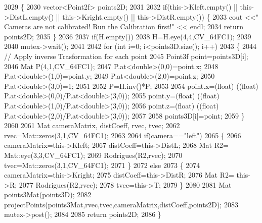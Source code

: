 \begin{DoxyCode}
2029 \{
2030     vector<Point2f> points2D;
2031 
2032     \textcolor{keywordflow}{if}(this->Kleft.empty() || this->DistL.empty() || this->Kright.empty() || this->DistR.empty()) \{
2033         cout <<\textcolor{stringliteral}{" Cameras are not calibrated! Run the Calibration first!"} << endl;
2034         \textcolor{keywordflow}{return} points2D;
2035     \}
2036 
2037     \textcolor{keywordflow}{if}(H.empty())
2038         H=H.eye(4,4,CV\_64FC1);
2039 
2040     mutex->wait();
2041 
2042     \textcolor{keywordflow}{for} (\textcolor{keywordtype}{int} i=0; i<points3D.size(); i++)
2043     \{   
2044         \textcolor{comment}{// Apply inverse Trasformation for each point}
2045         Point3f point=points3D[i];
2046         Mat P(4,1,CV\_64FC1);
2047         P.at<\textcolor{keywordtype}{double}>(0,0)=point.x;
2048         P.at<\textcolor{keywordtype}{double}>(1,0)=point.y;
2049         P.at<\textcolor{keywordtype}{double}>(2,0)=point.z;
2050         P.at<\textcolor{keywordtype}{double}>(3,0)=1;
2051 
2052         P=H.inv()*P;
2053 
2054         point.x=(float) ((\textcolor{keywordtype}{float}) P.at<\textcolor{keywordtype}{double}>(0,0)/P.at<\textcolor{keywordtype}{double}>(3,0));
2055         point.y=(float) ((\textcolor{keywordtype}{float}) P.at<\textcolor{keywordtype}{double}>(1,0)/P.at<\textcolor{keywordtype}{double}>(3,0));
2056         point.z=(float) ((\textcolor{keywordtype}{float}) P.at<\textcolor{keywordtype}{double}>(2,0)/P.at<\textcolor{keywordtype}{double}>(3,0));
2057 
2058         points3D[i]=point;
2059     \}
2060 
2061     Mat cameraMatrix, distCoeff, rvec, tvec;
2062     rvec=Mat::zeros(3,1,CV\_64FC1);
2063 
2064     \textcolor{keywordflow}{if}(camera==\textcolor{stringliteral}{"left"})
2065     \{
2066         cameraMatrix=this->Kleft;
2067         distCoeff=this->DistL;
2068         Mat R2= Mat::eye(3,3,CV\_64FC1);
2069         Rodrigues(R2,rvec);
2070         tvec=Mat::zeros(3,1,CV\_64FC1);
2071     \}
2072     \textcolor{keywordflow}{else}
2073     \{
2074         cameraMatrix=this->Kright;
2075         distCoeff=this->DistR;
2076         Mat R2= this->R;
2077         Rodrigues(R2,rvec);
2078         tvec=this->T;
2079     \}
2080 
2081     Mat points3Mat(points3D);
2082     projectPoints(points3Mat,rvec,tvec,cameraMatrix,distCoeff,points2D);
2083     mutex->post();
2084 
2085     \textcolor{keywordflow}{return} points2D;
2086 \}
\end{DoxyCode}
